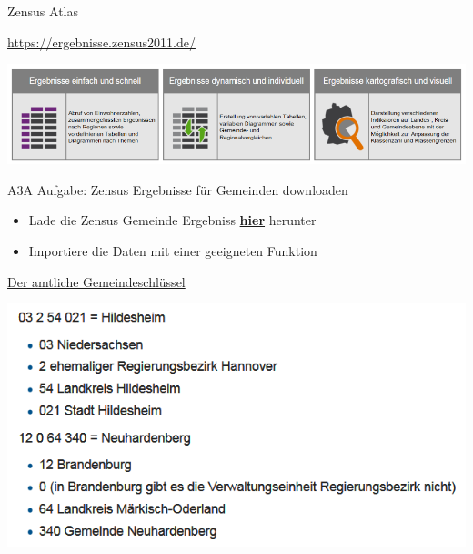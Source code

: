 \documentclass[ignorenonframetext,]{beamer}
\providecommand{\tightlist}{%
  \setlength{\itemsep}{0pt}\setlength{\parskip}{0pt}}
\begin{document}
\begin{frame}{Zensus Atlas}

\begin{block}{\url{https://ergebnisse.zensus2011.de/}}

\includegraphics{figure/Zensusdtb.PNG}

\end{block}

\end{frame}

\begin{frame}{A3A Aufgabe: Zensus Ergebnisse für Gemeinden downloaden}

\begin{itemize}
\tightlist
\item
  Lade die Zensus Gemeinde Ergebniss
  \href{https://www.zensus2011.de/SharedDocs/Aktuelles/Ergebnisse/DemografischeGrunddaten.html}{\textbf{hier}}
  herunter
\item
  Importiere die Daten mit einer geeigneten Funktion
\end{itemize}

\end{frame}

\begin{frame}{\href{https://de.wikipedia.org/wiki/Amtlicher_Gemeindeschl\%C3\%BCssel}{Der
amtliche Gemeindeschlüssel}}

\includegraphics{figure/ags_beispiele.PNG}

\end{frame}
\end{document}
